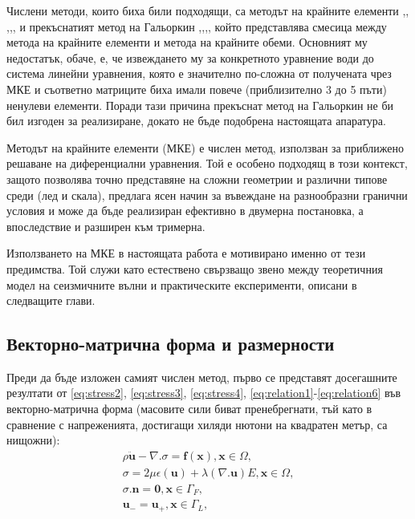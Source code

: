 \documentclass{report}
\begin{document}
	Числени методи, които биха били подходящи, са методът на крайните елементи \cite{larson2013finite},\cite{igel2017computational}, \cite{zienkiewicz2013fem},\cite{zak2024_fem_wave_prop},\cite{lee2021finite},\cite{hughes1987finite} и прекъснатият метод на Гальоркин \cite{hesthaven2008nodal},\cite{delcourte2009highorder},\cite{cockburn2003discontinuous},\cite{hansbo2003discontinuousCR}, който представлява смесица между метода на крайните елементи и метода на крайните обеми. Основният му недостатък, обаче, е, че извеждането му за конкретното уравнение води до система линейни уравнения, която е значително по-сложна от получената чрез МКЕ и съответно матриците биха имали повече (приблизително 3 до 5 пъти) ненулеви елементи. Поради тази причина прекъснат метод на Гальоркин не би бил изгоден за реализиране, докато не бъде подобрена настоящата апаратура.
	
	Методът на крайните елементи (МКЕ) е числен метод, използван за приближено решаване на диференциални уравнения. Той е особено подходящ в този контекст, защото позволява точно представяне на сложни геометрии и различни типове среди (лед и скала), предлага ясен начин за въвеждане на разнообразни гранични условия и може да бъде реализиран ефективно в двумерна постановка, а впоследствие и разширен към тримерна.
	
	Използването на МКЕ в настоящата работа е мотивирано именно от тези предимства. Той служи като естествено свързващо звено между теоретичния модел на сеизмичните вълни и практическите експерименти, описани в следващите глави.
	
	\subsection{Векторно-матрична форма и размерности}
	
	Преди да бъде изложен самият числен метод, първо се представят досегашните резултати от \ref{eq:stress2}, \ref{eq:stress3}, \ref{eq:stress4}, \ref{eq:relation1}-\ref{eq:relation6} 
	във векторно-матрична форма (масовите сили биват пренебрегнати, тъй като в сравнение с напреженията, достигащи хиляди нютони на квадратен метър, са нищожни):
	\begin{align}
		\rho \ddot{\mathbf{u}}- \nabla . \sigma= \mathbf{f}(\mathbf{x}), \mathbf{x} \in \Omega, \label{eq:6}\\
		\sigma = 2\mu \epsilon (\mathbf{u})+\lambda(\nabla . \mathbf{u})E, \mathbf{x} \in \Omega, \label{eq:7}\\
		\sigma . \mathbf{n} = \mathbf{0}, \mathbf{x} \in \Gamma_F, \label{eq:8}\\
		\mathbf{u}_-=\mathbf{u}_+, \mathbf{x} \in \Gamma_L, \label{eq:9}
	\end{align}
	
\end{document}
